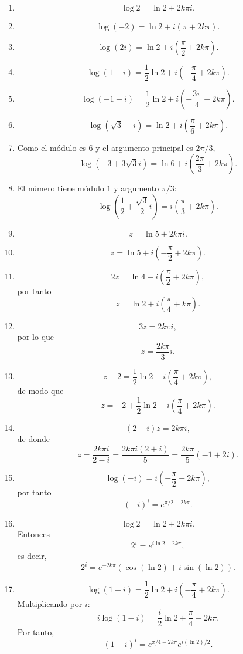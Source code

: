\documentclass[12pt]{article}
\theoremstyle{definition}
\theoremstyle{remark}
\begin{document}
\begin{enumerate}
\item
\[
\boxed{\log2=\ln2+2k\pi i.}
\]

\item
\[
\boxed{\log(-2)=\ln2+i(\pi+2k\pi).}
\]

\item
\[
\boxed{\log(2i)=\ln2+i\left(\frac{\pi}{2}+2k\pi\right).}
\]

\item
\[
\boxed{
\log(1-i)=\frac12\ln2
+i\left(-\frac{\pi}{4}+2k\pi\right).
}
\]

\item
\[
\boxed{
\log(-1-i)=\frac12\ln2
+i\left(-\frac{3\pi}{4}+2k\pi\right).
}
\]

\item
\[
\boxed{
\log(\sqrt3+i)
=\ln2+i\left(\frac{\pi}{6}+2k\pi\right).
}
\]

\item Como el módulo es $6$ y el argumento principal es $2\pi/3$,
\[
\boxed{
\log(-3+3\sqrt3 i)
=\ln6+i\left(\frac{2\pi}{3}+2k\pi\right).
}
\]

\item El número tiene módulo $1$ y argumento $\pi/3$:
\[
\boxed{
\log\left(\frac12+\frac{\sqrt3}{2}i\right)
=i\left(\frac{\pi}{3}+2k\pi\right).
}
\]

\item
\[
\boxed{z=\ln5+2k\pi i.}
\]

\item
\[
\boxed{
z=\ln5+i\left(-\frac{\pi}{2}+2k\pi\right).
}
\]

\item
\[
2z=\ln4+i\left(\frac{\pi}{2}+2k\pi\right),
\]
por tanto
\[
\boxed{
z=\ln2+i\left(\frac{\pi}{4}+k\pi\right).
}
\]

\item
\[
3z=2k\pi i,
\]
por lo que
\[
\boxed{z=\frac{2k\pi}{3}i.}
\]

\item
\[
z+2=\frac12\ln2+i\left(\frac{\pi}{4}+2k\pi\right),
\]
de modo que
\[
\boxed{
z=-2+\frac12\ln2
+i\left(\frac{\pi}{4}+2k\pi\right).
}
\]

\item
\[
(2-i)z=2k\pi i,
\]
de donde
\[
z=\frac{2k\pi i}{2-i}
=\frac{2k\pi i(2+i)}5
=\boxed{\frac{2k\pi}{5}(-1+2i)}.
\]

\item
\[
\log(-i)=i\left(-\frac{\pi}{2}+2k\pi\right),
\]
por tanto
\[
\boxed{
(-i)^i=e^{\pi/2-2k\pi}.
}
\]

\item
\[
\log2=\ln2+2k\pi i.
\]
Entonces
\[
2^i=e^{i\ln2-2k\pi},
\]
es decir,
\[
\boxed{
2^i=e^{-2k\pi}
\left(\cos(\ln2)+i\sin(\ln2)\right).
}
\]

\item
\[
\log(1-i)
=
\frac12\ln2+i\left(-\frac{\pi}{4}+2k\pi\right).
\]
Multiplicando por $i$:
\[
i\log(1-i)
=
\frac{i}{2}\ln2+\frac{\pi}{4}-2k\pi.
\]
Por tanto,
\[
\boxed{
(1-i)^i
=
e^{\pi/4-2k\pi}
e^{i(\ln2)/2}.
}
\]
\end{enumerate}
\end{document}
